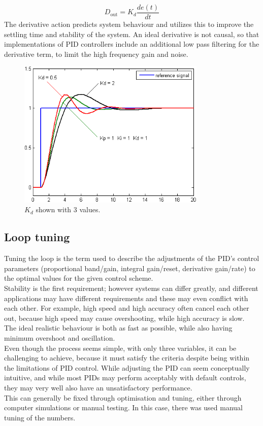 $$D_{\mathrm{out}}=K_d\frac{de(t)}{dt}$$
The derivative action predicts system behaviour and utilizes this to improve the settling time and stability of the system.
An ideal derivative is not causal, so that implementations of PID controllers include an additional low pass filtering for the derivative term, to limit the high frequency gain and noise.
\begin{figure}[h!]
  \centering
  \includegraphics[width=0.8\textwidth]{figures/Change_with_Kd.png}
  \caption{$K_d$ shown with 3 values.} 
  \label{PID controller}
\end{figure}

\newpage

\subsection {Loop tuning} 
Tuning the loop is the term used to describe the adjustments of the PID’s control parameters (proportional band/gain, integral gain/reset, derivative gain/rate) to the optimal values for the given control scheme. \\ Stability is the first requirement; however systems can differ greatly, and different applications may have different requirements and these may even conflict with each other. For example, high speed and high accuracy often cancel each other out, because high speed may cause overshooting, while high accuracy is slow.\\ The ideal realistic behaviour is both as fast as possible, while also having minimum overshoot and oscillation. \\ 

Even though the process seems simple, with only three variables, it can be challenging to achieve, because it must satisfy the criteria despite being within the limitations of PID control. While adjusting the PID can seem conceptually intuitive, and while most PIDs may perform acceptably with default controls, they may very well also have an unsatisfactory performance.\\ This can generally be fixed through optimisation and tuning, either through computer simulations or manual testing. In this case, there was used manual tuning of the numbers.

